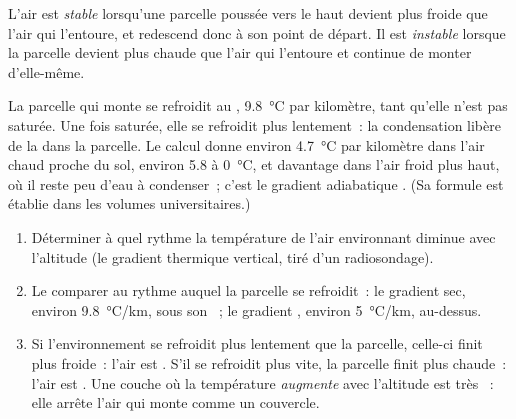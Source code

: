 \begin{definition}\label{def:g10:why-clouds-form:stability}
L'air est \emph{stable} lorsqu'une parcelle poussée vers
le haut devient plus froide que l'air qui l'entoure, et redescend donc à son
point de départ. Il est \emph{instable} lorsque la
parcelle devient plus chaude que l'air qui l'entoure et continue de monter
d'elle-même.
\end{definition}

La parcelle qui monte se refroidit au ,
\qty{9.8}{\degreeCelsius} par kilomètre, tant qu'elle n'est pas saturée.
Une fois saturée, elle se refroidit plus lentement~: la condensation libère
de la  dans la parcelle. Le calcul donne environ
\qty{4.7}{\degreeCelsius} par kilomètre dans l'air chaud proche du sol,
environ \num{5.8} à \qty{0}{\degreeCelsius}, et davantage dans l'air froid
plus haut, où il reste peu d'eau à condenser~; c'est le gradient
adiabatique . (Sa formule est établie dans les volumes
universitaires.)

\begin{method}\label{met:g10:why-clouds-form:stable}
\begin{enumerate}
  \item Déterminer à quel rythme la température de l'air environnant
        diminue avec l'altitude (le gradient thermique vertical, tiré d'un
        radiosondage).
  \item Le comparer au rythme auquel la parcelle se refroidit~: le
        gradient sec, environ \qty{9.8}{\degreeCelsius/km}, sous son ~; le gradient , environ
        \qty{5}{\degreeCelsius/km}, au-dessus.
  \item Si l'environnement se refroidit plus lentement que la parcelle,
        celle-ci finit plus froide~: l'air est . S'il se refroidit
        plus vite, la parcelle finit plus chaude~: l'air est . Une
        couche où la température \emph{augmente} avec l'altitude est très
        ~: elle arrête l'air qui monte comme un couvercle.
\end{enumerate}
\end{method}

